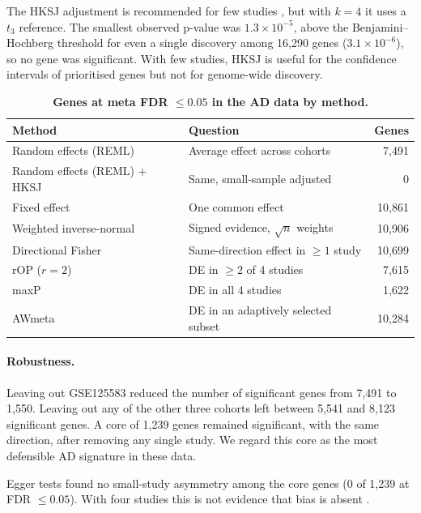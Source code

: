 \documentclass[11pt,a4paper]{article}
\begin{document}
The HKSJ adjustment is recommended for few studies \cite{inthout2014hksj}, but with $k = 4$ it uses a $t_3$ reference. The smallest observed p-value was $1.3\times10^{-5}$, above the Benjamini--Hochberg threshold for even a single discovery among 16,290 genes ($3.1\times10^{-6}$), so no gene was significant. With few studies, HKSJ is useful for the confidence intervals of prioritised genes but not for genome-wide discovery.

\begin{table}[!htbp]
\centering
\small
\caption{\textbf{Genes at meta FDR $\le 0.05$ in the AD data by method.}}
\label{tab:compare}
\begin{tabular}{l l r}
\toprule
\textbf{Method} & \textbf{Question} & \textbf{Genes} \\
\midrule
Random effects (REML) & Average effect across cohorts & 7,491 \\
Random effects (REML) + HKSJ & Same, small-sample adjusted & 0 \\
Fixed effect & One common effect & 10,861 \\
Weighted inverse-normal & Signed evidence, $\sqrt{n}$ weights & 10,906 \\
Directional Fisher & Same-direction effect in $\ge 1$ study & 10,699 \\
rOP ($r = 2$) & DE in $\ge 2$ of 4 studies & 7,615 \\
maxP & DE in all 4 studies & 1,622 \\
AWmeta & DE in an adaptively selected subset & 10,284 \\
\bottomrule
\end{tabular}
\end{table}

\paragraph{Robustness.} Leaving out GSE125583 reduced the number of significant genes from 7,491 to 1,550. Leaving out any of the other three cohorts left between 5,541 and 8,123 significant genes. A core of 1,239 genes remained significant, with the same direction, after removing any single study. We regard this core as the most defensible AD signature in these data.

Egger tests found no small-study asymmetry among the core genes (0 of 1,239 at FDR $\le 0.05$). With four studies this is not evidence that bias is absent \cite{sterne2011recommendations}.
\end{document}

